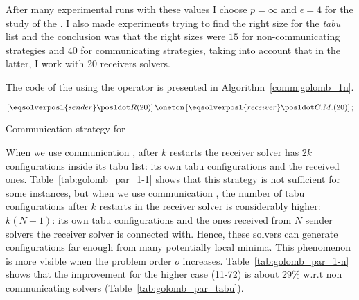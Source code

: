 {After many experimental runs with these values I choose $p = \infty$ and $\epsilon = 4$ for the study of the \commstr. I also made experiments trying to find the right size for the {\it tabu} list and the conclusion was that the right sizes were $15$ for non-communicating strategies and $40$ for communicating strategies, taking into account that in the latter, I work with 20 receivers solvers.
}



The \posl{} code of the \commstr{} using the \oneTn{} operator is presented in Algorithm~\ref{comm:golomb_1n}.

\begin{algorithm}[h]
\dontprintsemicolon
\SetNoline
$\left[\eqsolverposl{sender}\posldot R(20)\right] \oneton \left[\eqsolverposl{receiver}\posldot C.M.(20)\right];$
\caption{Communication strategy \oneTn{} for \GRP}\label{comm:golomb_1n}
\end{algorithm}

When we use communication \oneTone, after $k$ restarts the receiver solver has $2k$ configurations inside its tabu list: its own tabu configurations and the received ones. Table~\ref{tab:golomb_par_1-1} shows that this strategy is not sufficient for some instances, but when we use communication \oneTn, the number of tabu configurations after $k$ restarts in the receiver solver is considerably higher: $k(N+1)$: its own tabu configurations and the ones received from $N$ sender solvers the receiver solver is connected with. Hence, these solvers can generate configurations far enough from many potentially local minima.
This phenomenon is more visible when the problem order $o$ increases. Table~\ref{tab:golomb_par_1-n} shows that the improvement for the higher case (11-72) is about 29\% w.r.t non communicating solvers (Table~\ref{tab:golomb_par_tabu}).


